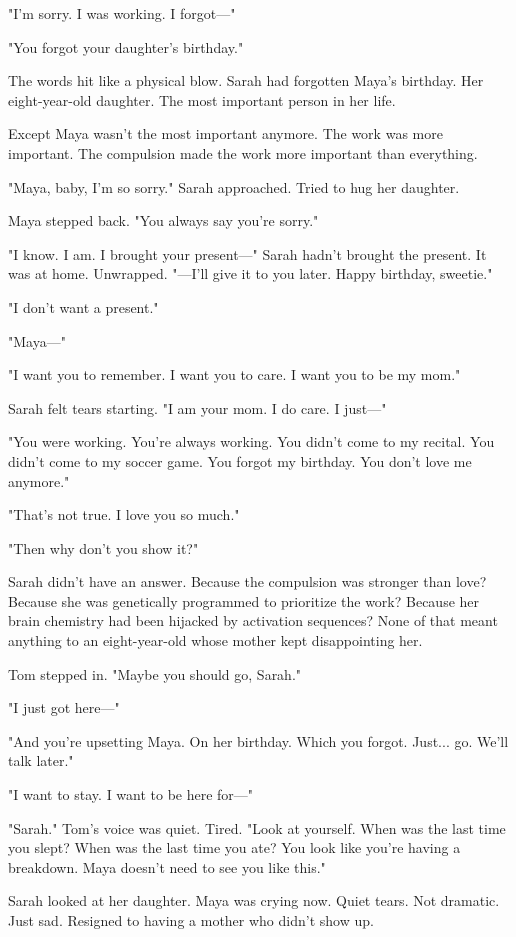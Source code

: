 "I'm sorry. I was working. I forgot—"

"You forgot your daughter's birthday."

The words hit like a physical blow. Sarah had forgotten Maya's birthday. Her eight-year-old daughter. The most important person in her life.

Except Maya wasn't the most important anymore. The work was more important. The compulsion made the work more important than everything.

"Maya, baby, I'm so sorry." Sarah approached. Tried to hug her daughter.

Maya stepped back. "You always say you're sorry."

"I know. I am. I brought your present—" Sarah hadn't brought the present. It was at home. Unwrapped. "—I'll give it to you later. Happy birthday, sweetie."

"I don't want a present."

"Maya—"

"I want you to remember. I want you to care. I want you to be my mom."

Sarah felt tears starting. "I am your mom. I do care. I just—"

"You were working. You're always working. You didn't come to my recital. You didn't come to my soccer game. You forgot my birthday. You don't love me anymore."

"That's not true. I love you so much."

"Then why don't you show it?"

Sarah didn't have an answer. Because the compulsion was stronger than love? Because she was genetically programmed to prioritize the work? Because her brain chemistry had been hijacked by activation sequences? None of that meant anything to an eight-year-old whose mother kept disappointing her.

Tom stepped in. "Maybe you should go, Sarah."

"I just got here—"

"And you're upsetting Maya. On her birthday. Which you forgot. Just... go. We'll talk later."

"I want to stay. I want to be here for—"

"Sarah." Tom's voice was quiet. Tired. "Look at yourself. When was the last time you slept? When was the last time you ate? You look like you're having a breakdown. Maya doesn't need to see you like this."

Sarah looked at her daughter. Maya was crying now. Quiet tears. Not dramatic. Just sad. Resigned to having a mother who didn't show up.

